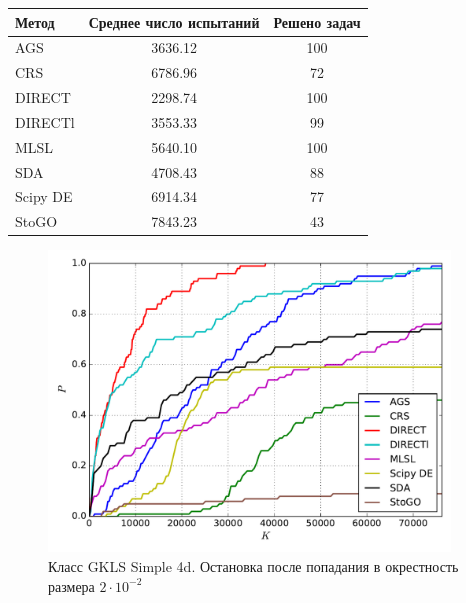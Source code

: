 \documentclass[a4paper]{article}
\begin{document}
\begin{tabular}{lcc}
\hline
 Метод    &  Среднее число испытаний  &  Решено задач  \\
\hline
 AGS      &          3636.12          &      100       \\
 CRS      &          6786.96          &       72       \\
 DIRECT   &          2298.74          &      100       \\
 DIRECTl  &          3553.33          &       99       \\
 MLSL     &          5640.10          &      100       \\
 SDA      &          4708.43          &       88       \\
 Scipy DE &          6914.34          &       77       \\
 StoGO    &          7843.23          &       43       \\
\hline
\end{tabular}
\begin{figure}[H]
  \center
  \includegraphics[width=0.95\textwidth]{../experiments/gklss4d/cmc.pdf}
  \caption{Класс GKLS Simple 4d. Остановка после попадания в окрестность размера $2\cdot10^{-2}$}
  \label{fig:}
\end{figure}
\end{document}
